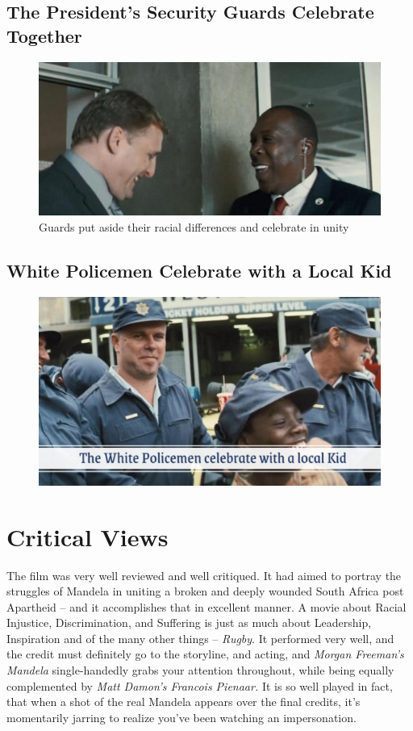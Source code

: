 \documentclass[11pt]{article}
\begin{document}
\subsection{The President's Security Guards Celebrate Together}

\begin{figure}[H]
	\centering
	\includegraphics[scale=0.4]{4.jpg}
	\caption{Guards put aside their racial differences and celebrate in unity}
\end{figure}

\subsection{White Policemen Celebrate with a Local Kid}

\begin{figure}[H]
	\centering
	\includegraphics[scale=0.37]{5.jpg}
\end{figure}

\section{Critical Views}
The film was very well reviewed and well critiqued. It had aimed to portray the
struggles of Mandela in uniting a broken and deeply wounded South Africa post
Apartheid – and it accomplishes that in excellent manner. A movie about Racial
Injustice, Discrimination, and Suffering is just as much about Leadership,
Inspiration and of the many other things – \textit{Rugby}.
It performed very well, and the credit must definitely go to the storyline, and
acting, and \textit{Morgan Freeman’s Mandela} single-handedly grabs your attention
throughout, while being equally complemented by \textit{Matt Damon’s Francois
Pienaar.}
It is so well played in fact, that when a shot of the real Mandela appears over the
final credits, it's momentarily jarring to realize you've been watching an
impersonation.
\end{document}
